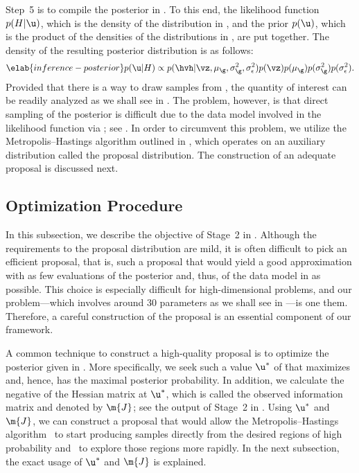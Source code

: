 Step~5 is to compile the posterior in . To this end, the
likelihood function $p(H | \u)$, which is the density of the distribution in
, and the prior $p(\u)$, which is the product of the
densities of the distributions in , are put together. The
density of the resulting posterior distribution is as follows:
\begin{equation} \elab{inference-posterior}
  p(\u | H) \propto p(\hvh | \vz, \mu_\g, \sigma^2_\g, \sigma^2_\epsilon) p(\vz) p(\mu_\g) p(\sigma^2_\g) p(\sigma^2_\epsilon).
\end{equation}
Provided that there is a way to draw samples from ,
the quantity of interest can be readily analyzed as we shall see in
. The problem, however, is that direct sampling
of the posterior is difficult due to the data model involved in the likelihood
function via \vh; see . In order to circumvent this
problem, we utilize the Metropolis--Hastings algorithm \cite{gelman2013}
outlined in , which operates on an auxiliary
distribution called the proposal distribution. The construction of an adequate
proposal is discussed next.

\subsection{Optimization Procedure}

In this subsection, we describe the objective of Stage~2 in
. Although the requirements to the proposal
distribution are mild, it is often difficult to pick an efficient proposal, that
is, such a proposal that would yield a good approximation with as few
evaluations of the posterior and, thus, of the data model in
 as possible. This choice is especially difficult for
high-dimensional problems, and our problem---which involves around 30 parameters
as we shall see in ---is one them. Therefore, a careful
construction of the proposal is an essential component of our framework.

A common technique to construct a high-quality proposal is to optimize the
posterior given in . More specifically, we seek such a
value $\u^*$ of \u that maximizes  and, hence, has the
maximal posterior probability. In addition, we calculate the negative of the
Hessian matrix at $\u^*$, which is called the observed information matrix and
denoted by $\m{J}$; see the output of Stage~2 in .
Using $\u^*$ and $\m{J}$, we can construct a proposal that would allow the
Metropolis--Hastings algorithm \one~to start producing samples directly from the
desired regions of high probability and \two~to explore those regions more
rapidly. In the next subsection, the exact usage of $\u^*$ and $\m{J}$ is
explained.


